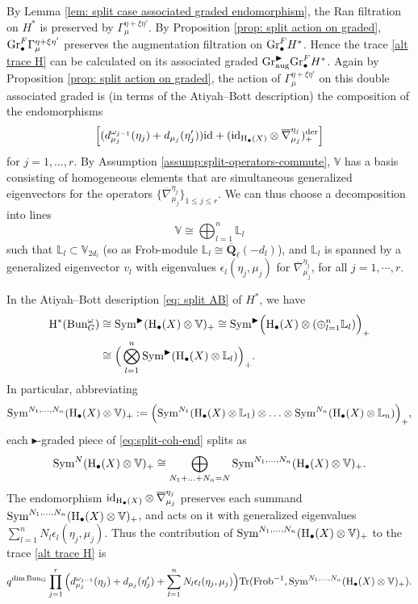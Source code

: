 \documentclass[reqno]{amsart}
\numberwithin{equation}{subsection}
\theoremstyle{definition}
\def\LL{\mathbb{L}}
\def\VV{\mathbb{V}}
\newcommand{\Bun}{\textup{Bun}}
\newcommand\Frob{\textup{Frob}}
\newcommand{\Gr}{\textup{Gr}}
\newcommand\id{\textup{id}}
\newcommand\Sym{\textup{Sym}}
\newcommand{\Tr}{\textup{Tr}}
\newcommand{\der}{\textup{der}}
\newcommand{\Qlbar}{\overline{\Q}_\ell}
\newcommand{\bu}{\bullet}
\newcommand{\ov}{\overline}
\newcommand\ot{\otimes}
\newcommand{\homog}[2]{\textup{H}_{#1}({#2})}  %
\newcommand{\y}{\eta}
\newcommand{\ep}{\epsilon}
\newcommand{\om}{\omega}
\newcommand\aug{\textup{aug}}
\newcommand\bl{\blacktriangleright}
\newcommand\nb{\nabla}
\newcommand{\Q}{\mathbf{Q}}
\newcommand{\rH}{\ensuremath{\mathrm{H}}\xspace}
\begin{document}
By Lemma \ref{lem: split case associated graded endomorphism}, the Ran filtration on $H^*$ is preserved by $\Gamma^{ \eta + \xi \eta'}_{\mu}$. By Proposition \ref{prop: split action on graded}, $\Gr^F_\bu\Gamma^{ \eta + \xi \eta'}_{\mu}$ preserves the augmentation filtration on $\Gr^F_\bu H^*$. Hence the trace \eqref{alt trace H} can be calculated on its associated graded $\Gr^{\bl}_{\aug}\Gr^{F}_{\bu} H^*$. Again by Proposition \ref{prop: split action on graded}, the action of $\Gamma^{ \eta + \xi \eta'}_\mu$ on this double associated graded is (in terms of the Atiyah--Bott description) the composition of the endomorphisms
\begin{equation}\label{eq: split endomorphism factor}
\left[(d^{\om_{j-1}}_{\mu_j}(\y_{j})+d_{\mu_j}(\y'_j))\id+(\id_{\homog{\bu}{X}}\ot\ov\nb^{\y_j}_{\mu_j})_{+}^{\der} \right] 
\end{equation}
for $ j = 1, \ldots, r$. By Assumption \ref{assump:split-operators-commute}, $\VV$ has a basis consisting of homogeneous elements that are simultaneous generalized eigenvectors for the operators $\{\ov\nb^{\y_j}_{\mu_j}\}_{1\le j\le r}$. We can thus choose a decomposition into lines
\[
\VV \cong \bigoplus_{l=1}^n  \LL_{l}
\]
such that $\LL_{l}\subset \VV_{2d_l}$ (so as Frob-module $\LL_l\cong \Qlbar(-d_l)$), and $\LL_l$ is spanned by a generalized eigenvector $v_l$ with eigenvalues $\epsilon_l(\eta_j, \mu_j)$ for $\ov\nb^{\y_j}_{\mu_j}$, for all $j=1,\cdots, r$. 

In the Atiyah--Bott description \eqref{eq: split AB} of $H^*$, we have 
\begin{align}\label{eq:split-coh-end}
\rH^*(\Bun_G^\omega) & \cong \Sym^{\bl} (\rH_{\bu}(X) \otimes \VV)_+ \cong \Sym^{\bl} \Big(\rH_{\bu}(X) \otimes (\oplus_{l=1}^n \LL_{l} )\Big)_+ \\
&\cong \Big(\bigotimes_{l=1}^n \Sym^{\bl} (\rH_{\bu}(X) \otimes \LL_{l}) \Big)_+.
\end{align}
In particular, abbreviating
\[
\Sym^{N_1, \ldots, N_n}(\rH_{\bu}(X) \otimes \VV)_+ := \Big(\Sym^{N_1} (\rH_{\bu}(X) \otimes \LL_1)  \otimes \ldots \otimes \Sym^{N_n} (\rH_{\bu}(X) \otimes \LL_n)\Big)_+,
\]
each $\bl$-graded piece of \eqref{eq:split-coh-end} splits as 
\[
\Sym^N (\rH_{\bu}(X) \otimes \VV)_+ \cong \bigoplus_{N_1 + \ldots + N_n = N} \Sym^{N_1, \ldots, N_n}(\rH_{\bu}(X) \otimes \VV)_+.
\]
The endomorphism $\id_{\homog{\bu}{X}}\ot \ov\nb^{\y_j}_{\mu_j}$ preserves each summand $\Sym^{N_1, \ldots, N_n}(\rH_{\bu}(X) \otimes \VV)_+$, and acts on it with generalized eigenvalues $\sum_{l=1}^n N_l \epsilon_l(\eta_j, \mu_j)$. Thus the contribution of $\Sym^{N_1, \ldots, N_n}(\rH_{\bu}(X) \otimes \VV)_+$ to the trace \eqref{alt trace H} is
\begin{equation}\label{trace on Sym Ni}
    q^{\dim\Bun_G}\prod_{j=1}^r\Big(d^{\om_{j-1}}_{\mu_j}(\y_j)+d_{\mu_j}(\y'_j)+\sum_{l=1}^nN_l\ep_l(\y_j,\mu_j) \Big)\Tr(\Frob^{-1}, \Sym^{N_1, \ldots, N_n}(\rH_{\bu}(X) \otimes \VV)_+).
\end{equation}
\end{document}
